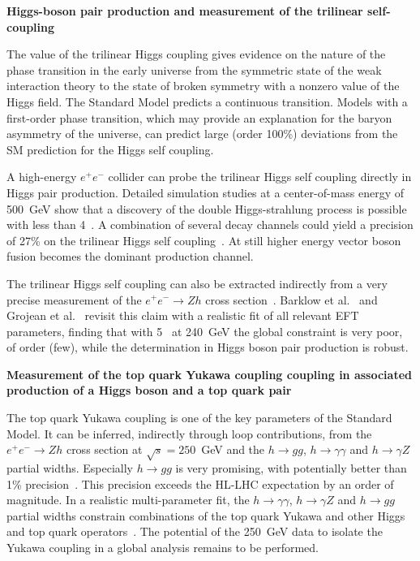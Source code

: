 {\bf Higgs-boson pair production and measurement of the trilinear self-coupling}

The value of the trilinear Higgs coupling gives evidence on the nature of the phase
transition  in  the  early  universe  from  the  symmetric  state  of  the  weak  interaction
theory to the state of broken symmetry with a nonzero value of the Higgs field. The
Standard Model predicts a continuous transition. Models with a first-order phase transition,
which may provide an explanation for the baryon asymmetry of the universe,
can predict large (order 100\%) deviations from the SM prediction for the Higgs self coupling.

A high-energy $e^+e^-$ collider can probe the trilinear Higgs self coupling directly in Higgs pair production.
Detailed simulation studies at a center-of-mass energy of 500~GeV show that a discovery of the
double Higgs-strahlung process is possible with less than 4~\iab. A combination of several decay channels
could yield a precision of 27\% on the trilinear Higgs self coupling~\cite{Duerig:2016dvi}.
At still higher energy vector boson fusion becomes the dominant production channel.


The trilinear Higgs self coupling can also be extracted indirectly from a very precise
measurement of the $e^+ e^- \rightarrow Zh$ cross section~\cite{McCullough:2013rea}. Barklow et al.~\cite{Barklow:2017awn}
and Grojean et al.~\cite{DiVita:2017vrr} revisit this claim with a realistic fit of
all relevant EFT parameters, finding that with 5~\iab{} at 240~GeV
the global constraint is very poor, of order (few), while the determination in Higgs boson pair production is robust. 

{\bf Measurement of the top quark Yukawa coupling coupling in associated production of a Higgs boson and a top quark pair}

The top quark Yukawa coupling is one of the key parameters of the Standard Model. 
It can be inferred, indirectly through loop contributions, from the $e^+e^- \rightarrow Zh$
cross section at $\sqrt{s}=  250$~GeV  and the $h \rightarrow gg$, $h \rightarrow \gamma \gamma$
and $h \rightarrow \gamma Z$ partial widths. Especially $h \rightarrow gg$ is very promising, with potentially
better than 1\% precision~\cite{Boselli:2018zxr}. This precision exceeds the HL-LHC expectation by an order of magnitude.
In a realistic multi-parameter fit, the $h \rightarrow \gamma \gamma$, $h \rightarrow \gamma Z$ and $h \rightarrow gg$
partial widths constrain combinations of the top quark Yukawa and other Higgs~\cite{Azatov:2016xik} and top quark
operators~\cite{Vryonidou:2018eyv}. The potential of the 250~GeV data to isolate the Yukawa
coupling in a global analysis remains to be performed.

